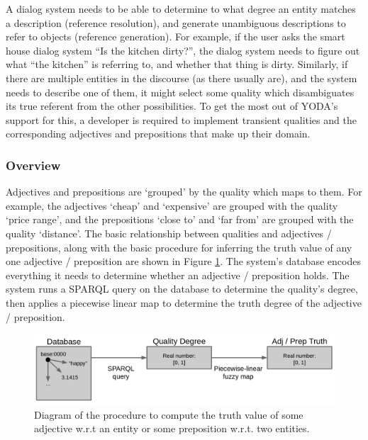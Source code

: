 \documentclass[titlepage]{article}
\begin{document}
A dialog system needs to be able to determine to what degree an entity matches a description (reference resolution), and generate unambiguous descriptions to refer to objects (reference generation).
For example, if the user asks the smart house dialog system ``Is the kitchen dirty?'', the dialog system needs to figure out what ``the kitchen'' is referring to, and whether that thing is dirty.
Similarly, if there are multiple entities in the discourse (as there usually are), and the system needs to describe one of them, it might select some quality which disambiguates its true referent from the other possibilities.
To get the most out of YODA's support for this, a developer is required to implement transient qualities and the corresponding adjectives and prepositions that make up their domain.\\

\subsubsection{Overview}

Adjectives and prepositions are `grouped' by the quality which maps to them. 
For example, the adjectives `cheap' and `expensive' are grouped with the quality `price range', and the prepositions `close to' and `far from' are grouped with the quality `distance'.
The basic relationship between qualities and adjectives / prepositions, along with the basic procedure for inferring the truth value of any one adjective / preposition are shown in Figure \ref{fig:quality_computation}.
The system's database encodes everything it needs to determine whether an adjective / preposition holds.
The system runs a SPARQL query on the database to determine the quality's degree, then applies a piecewise linear map to determine the truth degree of the adjective / preposition.


\begin{figure}[h!]
\centering
\includegraphics[width=\textwidth]{QualityComputation}
\caption{Diagram of the procedure to compute the truth value of some adjective w.r.t an entity or some preposition w.r.t. two entities.}
\label{fig:quality_computation}
\end{figure}
\end{document}
